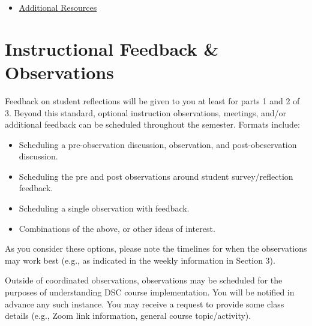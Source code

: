 \documentclass[
]{book}
\providecommand{\tightlist}{%
  \setlength{\itemsep}{0pt}\setlength{\parskip}{0pt}}
\begin{document}
\begin{itemize}
\tightlist
\item
  \href{https://docs.google.com/document/d/1XHivvQ13iZ-qqvm77h7R1OTw4cIv1VwA/edit?usp=sharing\&ouid=112414287104912137071\&rtpof=true\&sd=true}{Additional Resources}
\end{itemize}

\hypertarget{instructional-feedback-observations}{%
\chapter{Instructional Feedback \& Observations}\label{instructional-feedback-observations}}

Feedback on student reflections will be given to you at least for parts 1 and 2 of 3. Beyond this standard, optional instruction observations, meetings, and/or additional feedback can be scheduled throughout the semester. Formats include:

\begin{itemize}
\tightlist
\item
  Scheduling a pre-observation discussion, observation, and post-obeservation discussion.
\item
  Scheduling the pre and post observations around student survey/reflection feedback.
\item
  Scheduling a single observation with feedback.
\item
  Combinations of the above, or other ideas of interest.
\end{itemize}

As you consider these options, please note the timelines for when the observations may work best (e.g., as indicated in the weekly information in Section 3).

Outside of coordinated observations, observations may be scheduled for the purposes of understanding DSC course implementation. You will be notified in advance any such instance. You may receive a request to provide some class details (e.g., Zoom link information, general course topic/activity).

  
\end{document}
